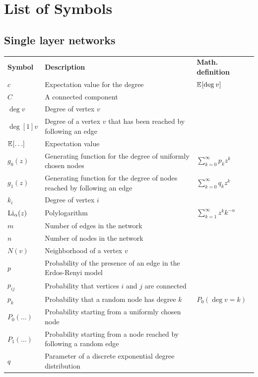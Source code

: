 \documentclass[
11pt, %
american, %
singlespacing, %
final, %
nolistspacing, %
liststotoc, %
headsepline, %
]{MastersDoctoralThesis} %
\begin{document}
\chapter*{List of Symbols}
{
\renewcommand{\arraystretch}{1.75}

\section*{Single layer networks}
\begin{longtable}{m{}m{}m{}}

\textbf{Symbol}	& \textbf{Description} & \textbf{Math. definition} \\
\addlinespace

$c$			& Expectation value for the degree & $\mathbb{E}_{}\!\left[ \mathrm{deg}_{}\, v \right]$ \\
$C$			& A connected component \\
$\deg{v}$	& Degree of vertex $v$ \\
$\deg[1]{v}$	& Degree of a vertex $v$ that has been reached by following an edge \\
$\expected{\dots}$	& Expectation value \\
$g_0(z)$	& Generating function for the degree of uniformly chosen nodes & $\sum_{k=0}^\infty p_k z^k$ \\
$g_1(z)$	& Generating function for the degree of nodes reached by following an edge & $\sum_{k=0}^\infty q_k z^k$ \\
$k_i$	& Degree of vertex $i$ \\
$\mathrm{Li}_{\alpha}\!\left(z\right)$	& Polylogarithm & $\sum_{k=1}^\infty z^k k^{-\alpha}$ \\
$m$		& Number of edges in the network \\
$n$			& Number of nodes in the network \\
$N(v)$ 		& Neighborhood of a vertex $v$ \\
$p$			& Probability of the presence of an edge in the Erdos-Renyi model \\
$p_{ij}$	& Probability that vertices $i$ and $j$ are connected \\
$p_k$		& Probability that a random node has degree $k$ & $P_0(\deg{v} = k)$ \\
$P_0(\dots)$	& Probability starting from a uniformly chosen node \\
$P_1(\dots)$	& Probability starting from a node reached by following a random edge \\
$q$			& Parameter of a discrete exponential degree distribution \\

\end{longtable}}
\end{document}
